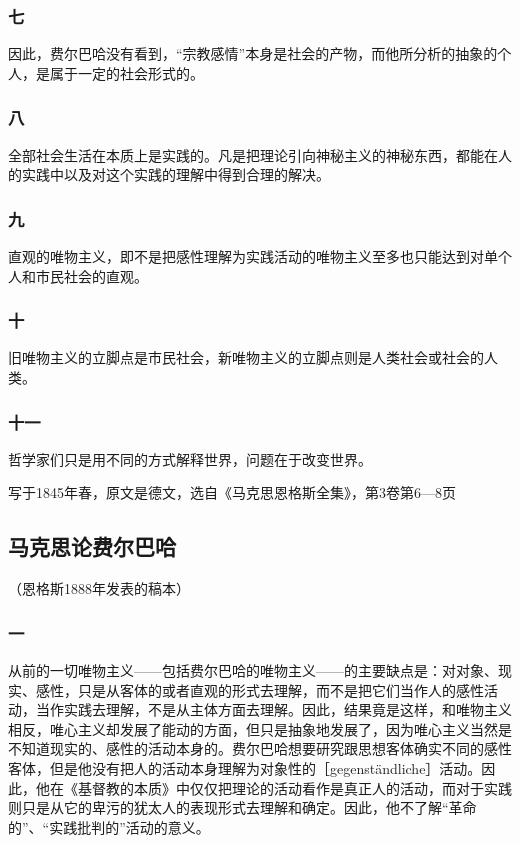 \documentclass[UTF8,zihao=-4,a4paper]{ctexart}
\begin{document}
\subsubsection*{七}
因此，费尔巴哈没有看到，“宗教感情”本身是社会的产物，而他所分析的抽象的个人，是属于一定的社会形式的。\par
\subsubsection*{八}
全部社会生活在本质上是实践的。凡是把理论引向神秘主义的神秘东西，都能在人的实践中以及对这个实践的理解中得到合理的解决。\par
\subsubsection*{九}
直观的唯物主义，即不是把感性理解为实践活动的唯物主义至多也只能达到对单个人和市民社会的直观。\par
\subsubsection*{十}
旧唯物主义的立脚点是市民社会，新唯物主义的立脚点则是人类社会或社会的人类。\par
\subsubsection*{十一}
哲学家们只是用不同的方式解释世界，问题在于改变世界。\par
写于1845年春，原文是德文，选自《马克思恩格斯全集》，第3卷第6—8页\par
\subsection*{马克思论费尔巴哈}
（恩格斯1888年发表的稿本）\par
\subsubsection*{一}
从前的一切唯物主义——包括费尔巴哈的唯物主义——的主要缺点是：对对象、现实、感性，只是从客体的或者直观的形式去理解，而不是把它们当作人的感性活动，当作实践去理解，不是从主体方面去理解。因此，结果竟是这样，和唯物主义相反，唯心主义却发展了能动的方面，但只是抽象地发展了，因为唯心主义当然是不知道现实的、感性的活动本身的。费尔巴哈想要研究跟思想客体确实不同的感性客体，但是他没有把人的活动本身理解为对象性的［gegenständliche］活动。因此，他在《基督教的本质》中仅仅把理论的活动看作是真正人的活动，而对于实践则只是从它的卑污的犹太人的表现形式去理解和确定。因此，他不了解“革命的”、“实践批判的”活动的意义。\par
\end{document}
